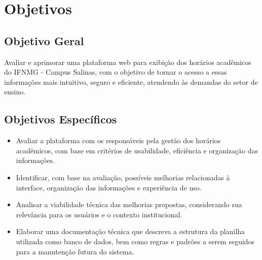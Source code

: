 \chapter{Objetivos} 
\label{cap2_objetivos} 

\section{Objetivo Geral}

Avaliar e aprimorar uma plataforma web para exibição dos horários acadêmicos do IFNMG - Campus Salinas, com o objetivo de tornar o acesso a essas informações mais intuitivo, seguro e eficiente, atendendo às demandas do setor de ensino.

\section{Objetivos Específicos}

\begin{itemize}
    \item Avaliar a plataforma com os responsáveis pela gestão dos horários acadêmicos, com base em critérios de usabilidade, eficiência e organização das informações.
    \item Identificar, com base na avaliação, possíveis melhorias relacionadas à interface, organização das informações e experiência de uso.
    \item Analisar a viabilidade técnica das melhorias propostas, considerando sua relevância para os usuários e o contexto institucional.
    \item Elaborar uma documentação técnica que descreva a estrutura da planilha utilizada como banco de dados, bem como regras e padrões a serem seguidos para a manutenção futura do sistema.
\end{itemize}